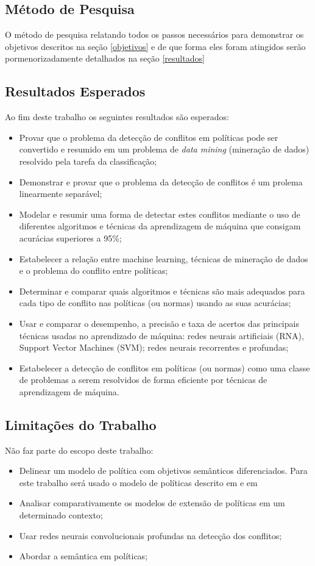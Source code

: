 \subsection{Método de Pesquisa} 
O método de pesquisa relatando todos os passos necessários para demonstrar os objetivos descritos na seção \ref{objetivos} e de que forma eles foram atingidos serão pormenorizadamente detalhados na seção \ref{resultados}

\subsection{Resultados Esperados}\label{resultados_esperados}
Ao fim deste trabalho os seguintes resultados são esperados:
\begin{itemize}
	\item Provar que o problema da detecção de conflitos em políticas pode ser convertido e resumido em um problema de \textit{data mining} (mineração de dados) resolvido pela tarefa da classificação;
	\item Demonstrar e provar que o problema da detecção de conflitos é um prolema linearmente separável;
	\item Modelar e resumir uma forma de detectar estes conflitos mediante o uso de diferentes algoritmos e técnicas da aprendizagem de máquina que consigam acurácias superiores a 95\%;
	\item Estabelecer a relação entre machine learning, técnicas de mineração de dados e o problema do conflito entre políticas;
	\item Determinar e comparar quais algoritmos e técnicas são mais adequados para cada tipo de conflito nas políticas (ou normas) usando as suas acurácias;
	\item Usar e comparar o desempenho, a precisão e taxa de acertos das principais técnicas usadas no aprendizado de máquina: redes neurais artificiais (RNA), Support Vector Machines (SVM); redes neurais recorrentes e profundas;
	\item Estabelecer a detecção de conflitos em políticas (ou normas) como uma  classe de problemas a serem resolvidos de forma eficiente por técnicas de aprendizagem de máquina.
\end{itemize} 

\subsection{Limitações do Trabalho}\label{limitacoes}
Não faz parte do escopo deste trabalho:
\begin{itemize}
	\item Delinear um modelo de política com objetivos semânticos diferenciados. Para este trabalho será usado o modelo de políticas descrito em \cite{sarkis2017} e em \cite{sarkis:artigo:2016}
	\item Analisar comparativamente os modelos de extensão de políticas em um determinado contexto;
	\item Usar redes neurais convolucionais profundas na detecção dos conflitos;
	\item Abordar a semântica em políticas;	
\end{itemize} 